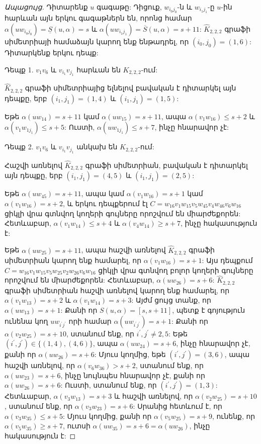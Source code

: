 \begin{hide}
\begin{proof}[Ապացույց]
Դիտարենք $u$ գագաթը: Դիցուք, $w_{i_{0}j_{0}}$-ն և $w_{i_{1}j_{1}}$-ը $u$-ին հարևան այն երկու գագաթներն են, որոնց համար
$\alpha(uw_{i_{0}j_{0}})=\underline{S}(u,\alpha)=s$ և
$\alpha(uw_{i_{1}j_{1}})=\overline{S}(u,\alpha)=s+11$: $\widehat{K}_{2,2,2}$ գրաֆի սիմետրիայի համաձայն կարող ենք ենթադրել, որ 
$(i_{0},j_{0})=(1,6)$: Դիտարկենք երկու դեպք:

Դեպք 1. $v_{1}v_{6}$ և $v_{i_{1}}v_{j_{1}}$ հարևան են 
$K_{2,2,2}$-ում:

$\widehat{K}_{2,2,2}$ գրաֆի սիմետրիայից ելնելով բավական է դիտարկել այն դեպքը, երբ $(i_{1},j_{1})=(1,4)$ և $(i_{1},j_{1})=(1,5)$:

Եթե $\alpha(uw_{14})=s+11$ կամ $\alpha(uw_{15})=s+11$, ապա
$\alpha(v_{1}w_{16})\leq s+2$ և $\alpha(v_{1}w_{1j_{1}})\leq s+5$:
Ուստի, $\alpha(uw_{1j_{1}})\leq s+7$, ինչը հնարավոր չէ:

Դեպք 2. $v_{1}v_{6}$ և $v_{i_{1}}v_{j_{1}}$ անկախ են $K_{2,2,2}$-ում:

Հաշվի առնելով $\widehat{K}_{2,2,2}$ գրաֆի սիմետրիան, բավական է դիտարկել այն դեպքը, երբ $(i_{1},j_{1})=(4,5)$ և $(i_{1},j_{1})=(2,5)$:

Եթե $\alpha(uw_{45})=s+11$, ապա կամ $\alpha(v_{1}w_{16})=s+1$ կամ
$\alpha(v_{1}w_{16})=s+2$, և երկու դեպքերում էլ 
$C=w_{16}v_{1}w_{15}v_{5}w_{45}v_{4}w_{46}v_{6}w_{16}$ ցիկլի վրա գտնվող կողերի գույները որոշվում են միարժեքորեն:
Հետևաբար, $\alpha(v_{1}w_{14})\leq s+4$ և
$\alpha(v_{4}w_{14})\geq s+7$, ինչը հակասություն է:

Եթե $\alpha(uw_{25})=s+11$, ապա հաշվի առնելով 
$\widehat{K}_{2,2,2}$ գրաֆի սիմետրիան կարող ենք համարել, որ $\alpha(v_{1}w_{16})=s+1$:
Այս դեպքում 
$C=w_{16}v_{1}w_{15}v_{5}w_{25}v_{2}w_{26}v_{6}w_{16}$ ցիկլի վրա գտնվող բոլոր կողերի գույները որոշվում են միարժեքորեն: Հետևաբար, $\alpha(uw_{26})=s+6$: $\widehat{K}_{2,2,2}$ գրաֆի սիմետրիան հաշվի առնելով կարող ենք համարել, որ 
$\alpha(v_{1}w_{13})=s+2$ և $\alpha(v_{1}w_{14})=s+3$: Այժմ ցույց տանք, որ $\alpha(uw_{13})=s+1$: Քանի որ $S(u,\alpha)=[s,s+11]$, պետք է գոյություն ունենա կող $uw_{i^{\prime}j^{\prime}}$ որի համար
$\alpha\left(uw_{i^{\prime}j^{\prime}}\right)=s+1$: Քանի որ
$\alpha(v_{2}w_{25})=s+10$, ստանում ենք, որ $i^{\prime},j^{\prime}
\neq 2,5$: Եթե $\left(i^{\prime},j^{\prime}\right)\in
\{(1,4),(4,6)\}$, ապա $\alpha(uw_{24})=s+6$, ինչը հնարավոր չէ, քանի որ $\alpha(uw_{26})=s+6$: Մյուս կողմից, եթե 
$\left(i^{\prime},j^{\prime}\right)=(3,6)$, ապա հաշվի առնելով, որ
$\alpha(v_{6}w_{36})>s+2$, ստանում ենք, որ $\alpha(uw_{23})=s+6$, ինչը նույնպես հնարավոր չէ, քանի որ $\alpha(uw_{26})=s+6$: Ուստի, ստանում ենք, որ
$\left(i^{\prime},j^{\prime}\right)=(1,3)$: Հետևաբար,
$\alpha(v_{3}w_{13})=s+3$ և հաշվի առնելով, որ 
$\alpha(v_{2}w_{25})=s+10$, ստանում ենք, որ $\alpha(v_{3}w_{23})=s+6$: Սրանից հետևում է, որ $\alpha(v_{3}w_{35})\leq s+5$: Մյուս կողմից, քանի որ 
$\alpha(v_{5}w_{25})=s+9$, ունենք, որ $\alpha(v_{5}w_{35})\geq s+7$, ուտսի $\alpha(uw_{35})=s+6=\alpha(uw_{26})$, ինչը հակասություն է:
\end{proof}
\end{hide}

